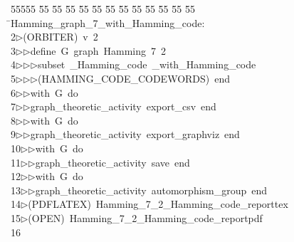 %
%
\begin{tabbing}
55555 \= 55 \= 55 \= 55 \= 55 \= 55 \= 55 \= 55 \= 55 \= 55 \= 55 \= 55 \= 55 \= \>Hamming\_graph\_7\_with\_Hamming\_code:\\[0pt]
2\>$\triangleright$\>(ORBITER)\ v\ 2\ \\[0pt]
3\>$\triangleright$\>$\triangleright$\>define\ G\ graph\ Hamming\ 7\ 2\ \\[0pt]
4\>$\triangleright$\>$\triangleright$\>$\triangleright$\>subset\ \_Hamming\_code\ \_with\_Hamming\_code\ \\[0pt]
5\>$\triangleright$\>$\triangleright$\>$\triangleright$\>(HAMMING\_CODE\_CODEWORDS)\ end\ \\[0pt]
6\>$\triangleright$\>$\triangleright$\>with\ G\ do\ \\[0pt]
7\>$\triangleright$\>$\triangleright$\>graph\_theoretic\_activity\ export\_csv\ end\ \\[0pt]
8\>$\triangleright$\>$\triangleright$\>with\ G\ do\ \\[0pt]
9\>$\triangleright$\>$\triangleright$\>graph\_theoretic\_activity\ export\_graphviz\ end\ \\[0pt]
10\>$\triangleright$\>$\triangleright$\>with\ G\ do\ \\[0pt]
11\>$\triangleright$\>$\triangleright$\>graph\_theoretic\_activity\ save\ end\ \\[0pt]
12\>$\triangleright$\>$\triangleright$\>with\ G\ do\ \\[0pt]
13\>$\triangleright$\>$\triangleright$\>graph\_theoretic\_activity\ automorphism\_group\ end\\[0pt]
14\>$\triangleright$\>(PDFLATEX)\ Hamming\_7\_2\_Hamming\_code\_reporttex\\[0pt]
15\>$\triangleright$\>(OPEN)\ Hamming\_7\_2\_Hamming\_code\_reportpdf\\[0pt]
16\>\end{tabbing}
